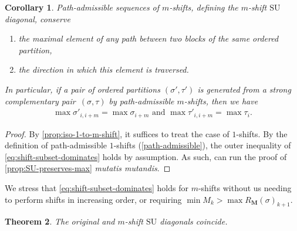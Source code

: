 \documentclass{amsart}
\newtheorem{theorem}{Theorem}[section]
\newtheorem{corollary}[theorem]{Corollary}
\theoremstyle{definition}
\newcommand{\SU}{\mathrm{SU}}
\begin{document}
\begin{corollary} 
\label{cor:SU-shift-preserves-max}
Path-admissible sequences of $m$-shifts, defining the $m$-shift $\SU$ diagonal, conserve 
\begin{enumerate}
	\item the maximal element of any path between two blocks of the same ordered partition,
	\item the direction in which this element is traversed. 
\end{enumerate}
In particular, if a pair of ordered partitions $(\sigma',\tau')$ is generated from a strong complementary pair~$(\sigma,\tau)$ by path-admissible $m$-shifts, then we have
\begin{align}
	\label{eq:max-3}
	\max \sigma'_{i,i+m} = \max \sigma_{i+m} \text{ and } \max \tau'_{i,i+m} = \max \tau_{i} .
\end{align}
\end{corollary}

\begin{proof}
By \cref{prop:iso-1-to-m-shift}, it suffices to treat the case of $1$-shifts. 
By the definition of path-admissible $1$-shifts (\cref{path-admissible}), the outer inequality of \cref{eq:shift-subset-dominates} holds by assumption.
As such, can run the proof of \cref{prop:SU-preserves-max} \emph{mutatis mutandis}.
\end{proof}

We stress that \cref{eq:shift-subset-dominates} holds for $m$-shifts without us needing to perform shifts in increasing order, or requiring $\min M_k > \max R_{\mathbf{M}}(\sigma)_{k+1}$.

\begin{theorem}
\label{prop:iso-original-shift-diagonals}
The original and $m$-shift $\SU$ diagonals coincide.
\end{theorem}
\end{document}
